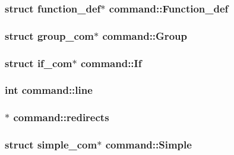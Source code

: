 \subsubsection[{\texorpdfstring{Function\+\_\+def}{Function_def}}]{\setlength{\rightskip}{0pt plus 5cm}struct {\bf function\+\_\+def}$\ast$ command\+::\+Function\+\_\+def}\hypertarget{structcommand_a0f27ea57892789c32125560aa6b58372}{}\label{structcommand_a0f27ea57892789c32125560aa6b58372}
\subsubsection[{\texorpdfstring{Group}{Group}}]{\setlength{\rightskip}{0pt plus 5cm}struct {\bf group\+\_\+com}$\ast$ command\+::\+Group}\hypertarget{structcommand_a3be5f23cdfe7367575228ab7c8a98c8a}{}\label{structcommand_a3be5f23cdfe7367575228ab7c8a98c8a}
\subsubsection[{\texorpdfstring{If}{If}}]{\setlength{\rightskip}{0pt plus 5cm}struct {\bf if\+\_\+com}$\ast$ command\+::\+If}\hypertarget{structcommand_a7ebce7bca0b62a919f8ad0157046a58c}{}\label{structcommand_a7ebce7bca0b62a919f8ad0157046a58c}
\subsubsection[{\texorpdfstring{line}{line}}]{\setlength{\rightskip}{0pt plus 5cm}int command\+::line}\hypertarget{structcommand_a35171ddf374dcfc97662a6b3965d2ad0}{}\label{structcommand_a35171ddf374dcfc97662a6b3965d2ad0}
\subsubsection[{\texorpdfstring{redirects}{redirects}}]{$\ast$ command\+::redirects}\hypertarget{structcommand_a5b5efa4854e0319791e28028712fee9a}{}\label{structcommand_a5b5efa4854e0319791e28028712fee9a}
\subsubsection[{\texorpdfstring{Simple}{Simple}}]{\setlength{\rightskip}{0pt plus 5cm}struct {\bf simple\+\_\+com}$\ast$ command\+::\+Simple}\hypertarget{structcommand_ab3ddc136c7f74d323c4bd1afc97a5864}{}\label{structcommand_ab3ddc136c7f74d323c4bd1afc97a5864}
